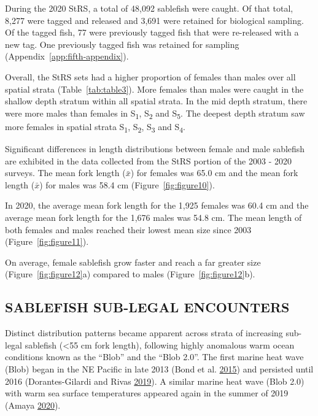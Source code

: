 \documentclass[12pt]{article}\usepackage[]{graphicx}\usepackage[]{color}
\begin{document}
During the 2020 StRS, a total of 48,092 sablefish were caught. Of that total, 8,277 were tagged and released and 3,691 were retained for biological sampling. Of the tagged fish, 77 were previously tagged fish that were re-released with a new tag. One previously tagged fish was retained for sampling (Appendix~\ref{app:fifth-appendix}).

Overall, the StRS sets had a higher proportion of females than males over all spatial strata (Table~\ref{tab:table3}). More females than males were caught in the shallow depth stratum within all spatial strata. In the mid depth stratum, there were more males than females in S\textsubscript{1}, S\textsubscript{2} and S\textsubscript{5}. The deepest depth stratum saw more females in spatial strata S\textsubscript{1}, S\textsubscript{2}, S\textsubscript{3} and S\textsubscript{4}.

Significant differences in length distributions between female and male sablefish are exhibited in the data collected from the StRS portion of the 2003 - 2020 surveys. The mean fork length (\(\bar{x}\)) for females was 65.0 cm and the mean fork length (\(\bar{x}\)) for males was 58.4 cm (Figure~\ref{fig:figure10}).

In 2020, the average mean fork length for the 1,925 females was 60.4 cm and the average mean fork length for the 1,676 males was 54.8 cm. The mean length of both females and males reached their lowest mean size since 2003 (Figure~\ref{fig:figure11}).

On average, female sablefish grow faster and reach a far greater size (Figure~\ref{fig:figure12}a) compared to males (Figure~\ref{fig:figure12}b).

\hypertarget{sablefish-sub-legal-encounters}{%
\subsection{SABLEFISH SUB-LEGAL ENCOUNTERS}\label{sablefish-sub-legal-encounters}}

Distinct distribution patterns became apparent across strata of increasing sub-legal sablefish (\textless55 cm fork length), following highly anomalous warm ocean conditions known as the ``Blob'' and the ``Blob 2.0''. The first marine heat wave (Blob) began in the NE Pacific in late 2013 (Bond et al. \protect\hyperlink{ref-Bond2015}{2015}) and persisted until 2016 (Dorantes-Gilardi and Rivas \protect\hyperlink{ref-DORANTESGILARD2020}{2019}). A similar marine heat wave (Blob 2.0) with warm sea surface temperatures appeared again in the summer of 2019 (Amaya \protect\hyperlink{ref-Amaya2020}{2020}).
\end{document}

